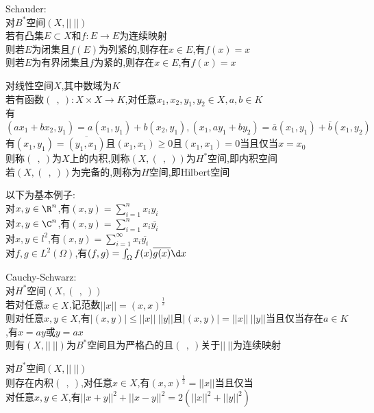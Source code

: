 \begin{dingli}
Schauder:\\
对$B^*$空间$(X,||\ ||)$\\
若有凸集$E\subset X$和$f:E\to E$为连续映射\\
则若$E$为闭集且$f(E)$为列紧的,则存在$x\in E$,有$f(x)=x$\\
则若$E$为有界闭集且$f$为紧的,则存在$x\in E$,有$f(x)=x$
\end{dingli}

\begin{dingyi}
对线性空间$X$,其中数域为$K$\\
若有函数$(\ \ ,\ ):X\times X\to K$,对任意$x_1,x_2,y_1,y_2\in X,a,b\in K$\\
有$(ax_1+bx_2,y_1)=a(x_1,y_1)+b(x_2,y_1),(x_1,ay_1+by_2)=\overline{a}(x_1,y_1)+\overline{b}(x_1,y_2)$\\
有$(x_1,y_1)=\overline{(y_1,x_1)}$且$(x_1,x_1)\geq 0$且$(x_1,x_1)=0$当且仅当$x=x_0$\\
则称$(\ \ ,\ )$为$X$上的内积,则称$(X,(\ \ ,\ ))$为$H^*$空间,即内积空间\\
若$(X,(\ \ ,\ ))$为完备的,则称为$H$空间,即Hilbert空间
\end{dingyi}

\begin{zhu}
以下为基本例子:\\
对$x,y\in \R^n$,有$(x,y)=\sum\limits_{i=1}^{n}x_iy_i$\\
对$x,y\in \C^n$,有$(x,y)=\sum\limits_{i=1}^{n}x_i\overline{y_i}$\\
对$x,y\in l^2$,有$(x,y)=\sum\limits_{i=1}^{\infty}x_i\overline{y_i}$\\
对$f,g\in L^2(\Omega)$,有$(f,g)=\int_{\Omega}f(x)\overline{g(x)}\d x$
\end{zhu}

\begin{dingli}
Cauchy-Schwarz:\\
对$H^*$空间$(X,(\ \ ,\ ))$\\
若对任意$x\in X$,记范数$||x||=(x,x)^{\frac{1}{2}}$\\
则对任意$x,y\in X$,有$|(x,y)|\leq||x||\ ||y||$且$|(x,y)|=||x||\ ||y||$当且仅当存在$a\in K$,有$x=ay$或$y=ax$\\
则有$(X,||\ ||)$为$B^*$空间且为严格凸的且$(\ \ ,\ )$关于$||\ ||$为连续映射
\end{dingli}

\begin{dingli}
对$B^*$空间$(X,||\ ||)$\\
则存在内积$(\ \ ,\ )$,对任意$x\in X$,有$(x,x)^{\frac{1}{2}}=||x||$当且仅当\\
对任意$x,y\in X$,有$||x+y||^2+||x-y||^2=2(||x||^2+||y||^2)$
\end{dingli}

